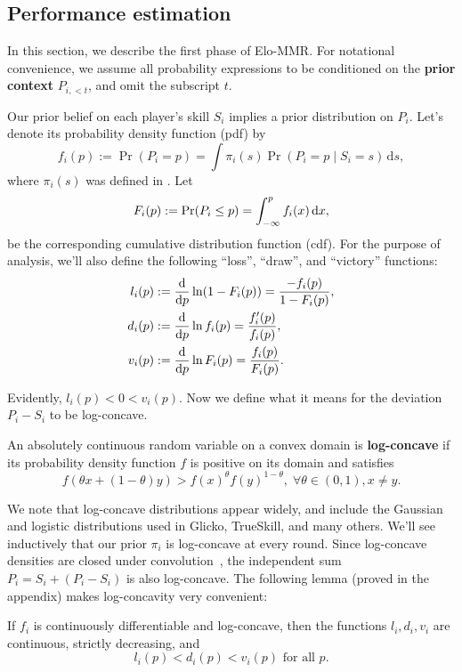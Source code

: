 \subsection{Performance estimation}
\label{sec:performance}

In this section, we describe the first phase of Elo-MMR. For notational convenience, we assume all probability expressions to be conditioned on the \textbf{prior context} $P_{i,< t}$, and omit the subscript $t$.

Our prior belief on each player's skill $S_i$ implies a prior distribution on $P_i$. Let's denote its probability density function (pdf) by
\begin{equation}
\label{eq:perf-prior} 
f_i(p) := \Pr(P_i = p) = \int \pi_i(s) \Pr(P_i = p \mid S_i=s) \,\mathrm{d}s,
\end{equation}
where $\pi_i(s)$ was defined in . Let
\[F_i(p) := \Pr(P_i\le p) = \int_{-\infty}^p f_i(x) \,\mathrm{d}x,\]
be the corresponding cumulative distribution function (cdf). For the purpose of analysis, we'll also define the following ``loss'', ``draw'', and ``victory'' functions:
\begin{align*}
l_i(p) &:= \frac{\mathrm{d}}{\mathrm{d}p}\ln(1-F_i(p)) = \frac{-f_i(p)}{1 - F_i(p)},
\\d_i(p) &:= \frac{\mathrm{d}}{\mathrm{d}p}\ln f_i(p) = \frac{f'_i(p)}{f_i(p)},
\\v_i(p) &:= \frac{\mathrm{d}}{\mathrm{d}p}\ln F_i(p) = \frac{f_i(p)}{F_i(p)}.
\end{align*}

Evidently, $l_i(p) < 0 < v_i(p)$. Now we define what it means for the deviation $P_i - S_i$ to be log-concave.
\begin{definition}
\label{def:log-concave}
An absolutely continuous random variable on a convex domain is \textbf{log-concave} if its probability density function $f$ is positive on its domain and satisfies
\[f(\theta x + (1-\theta) y) > f(x)^\theta f(y)^{1-\theta},\;\forall\theta\in(0,1),x\neq y.\]
\end{definition}

We note that log-concave distributions appear widely, and include the Gaussian and logistic distributions used in Glicko, TrueSkill, and many others. We'll see inductively that our prior $\pi_i$ is log-concave at every round. Since log-concave densities are closed under convolution~\cite{concave}, the independent sum $P_i=S_i+(P_i-S_i)$ is also log-concave. The following lemma (proved in the appendix) makes log-concavity very convenient:
\begin{lemma}
\label{lem:decrease}
If $f_i$ is continuously differentiable and log-concave, then the functions $l_i,d_i,v_i$ are continuous, strictly decreasing, and
\[l_i(p) < d_i(p) < v_i(p) \text{ for all }p.\]
\end{lemma}

